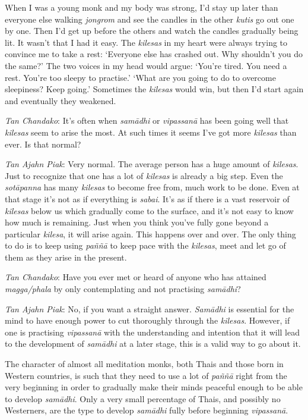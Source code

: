 When I was a young monk and my body was strong, I'd stay up later than
everyone else walking \emph{jongrom} and see the candles in the other
\emph{kutis} go out one by one. Then I'd get up before the others and
watch the candles gradually being lit. It wasn't that I had it easy. The
\emph{kilesas} in my heart were always trying to convince me to take a
rest: `Everyone else has crashed out. Why shouldn't you do the same?'
The two voices in my head would argue: `You're tired. You need a rest.
You're too sleepy to practise.' `What are you going to do to overcome
sleepiness? Keep going.' Sometimes the \emph{kilesas} would win, but
then I'd start again and eventually they weakened.

\emph{Tan Chandako}: It's often when \emph{samādhi} or \emph{vipassanā}
has been going well that \emph{kilesas} seem to arise the most. At such
times it seems I've got more \emph{kilesas} than ever. Is that normal?

\emph{Tan Ajahn Piak}: Very normal. The average person has a huge amount
of \emph{kilesas}. Just to recognize that one has a lot of
\emph{kilesas} is already a big step. Even the \emph{sotāpanna} has many
\emph{kilesas} to become free from, much work to be done. Even at that
stage it's not as if everything is \emph{sabai}. It's as if there is a
vast reservoir of \emph{kilesas} below us which gradually come to the
surface, and it's not easy to know how much is remaining. Just when you
think you've fully gone beyond a particular \emph{kilesa}, it will arise
again. This happens over and over. The only thing to do is to keep using
\emph{paññā} to keep pace with the \emph{kilesas}, meet and let go of
them as they arise in the present.

\emph{Tan Chandako}: Have you ever met or heard of anyone who has
attained \emph{magga/phala} by only contemplating and not practising
\emph{samādhi}?

\emph{Tan Ajahn Piak}: No, if you want a straight answer. \emph{Samādhi}
is essential for the mind to have enough power to cut thoroughly through
the \emph{kilesas}. However, if one is practising \emph{vipassanā} with
the understanding and intention that it will lead to the development of
\emph{samādhi} at a later stage, this is a valid way to go about it.

The character of almost all meditation monks, both Thais and those born
in Western countries, is such that they need to use a lot of
\emph{paññā} right from the very beginning in order to gradually make
their minds peaceful enough to be able to develop \emph{samādhi}. Only a
very small percentage of Thais, and possibly no Westerners, are the type
to develop \emph{samādhi} fully before beginning \emph{vipassanā}.

